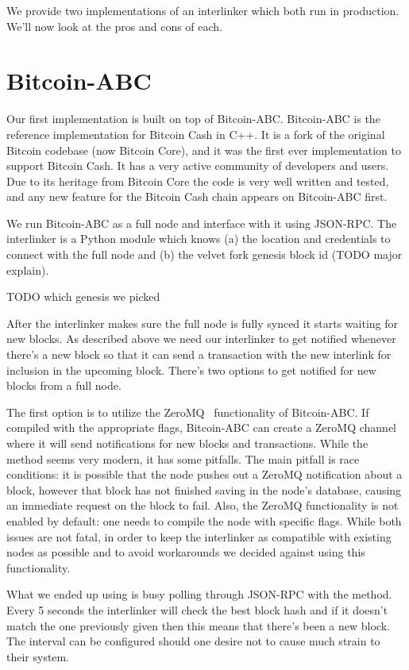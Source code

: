 We provide two implementations of an interlinker which both run in production. We'll now look at the pros and cons of each.

\section{Bitcoin-ABC}
Our first implementation is built on top of Bitcoin-ABC. Bitcoin-ABC is the reference implementation for Bitcoin Cash in C++. It is a fork of the original Bitcoin codebase (now Bitcoin Core), and it was the first ever implementation to support Bitcoin Cash. It has a very active community of developers and users. Due to its heritage from Bitcoin Core the code is very well written and tested, and any new feature for the Bitcoin Cash chain appears on Bitcoin-ABC first.

We run Bitcoin-ABC as a full node and interface with it using JSON-RPC. The interlinker is a Python module which knows (a) the location and credentials to connect with the full node and (b) the velvet fork genesis block id (TODO major explain).

TODO which genesis we picked

After the interlinker makes sure the full node is fully synced it starts waiting for new blocks. As described above we need our interlinker to get notified whenever there's a new block so that it can send a transaction with the new interlink for inclusion in the upcoming block. There's two options to get notified for new blocks from a full node.

The first option is to utilize the ZeroMQ~\cite{zmq} functionality of Bitcoin-ABC. If compiled with the appropriate flags, Bitcoin-ABC can create a ZeroMQ channel where it will send notifications for new blocks and transactions. While the method seems very modern, it has some pitfalls. The main pitfall is race conditions: it is possible that the node pushes out a ZeroMQ notification about a block, however that block has not finished saving in the node's database, causing an immediate  request on the block to fail. Also, the ZeroMQ functionality is not enabled by default: one needs to compile the node with specific flags. While both issues are not fatal, in order to keep the interlinker as compatible with existing nodes as possible and to avoid workarounds we decided against using this functionality.

What we ended up using is busy polling through JSON-RPC with the  method. Every 5 seconds the interlinker will check the best block hash and if it doesn't match the one previously given then this means that there's been a new block. The interval can be configured should one desire not to cause much strain to their system.

